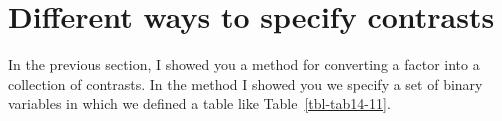 \documentclass[
  a4paper,
]{book}
\begin{document}
\hypertarget{different-ways-to-specify-contrasts}{%
\section{Different ways to specify
contrasts}\label{different-ways-to-specify-contrasts}}

In the previous section, I showed you a method for converting a factor
into a collection of contrasts. In the method I showed you we specify a
set of binary variables in which we defined a table like
Table~\ref{tbl-tab14-11}.

\hypertarget{tbl-tab14-11}{}
 
  \providecommand{\huxb}[2]{\arrayrulecolor[RGB]{#1}\global\arrayrulewidth=#2pt}
  \providecommand{\huxvb}[2]{\color[RGB]{#1}\vrule width #2pt}
  \providecommand{\huxtpad}[1]{\rule{0pt}{#1}}
  \providecommand{\huxbpad}[1]{\rule[-#1]{0pt}{#1}}
\end{document}

